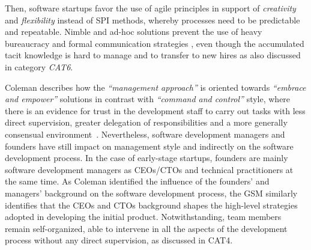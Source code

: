 \documentclass[10pt,journal,letterpaper,compsoc]{IEEEtran}
\begin{document}
Then, software startups favor the use of agile principles in support of
\textit{creativity} and \textit{flexibility} instead of SPI methods, whereby
processes need to be predictable and repeatable. Nimble and ad-hoc solutions
prevent the use of heavy bureaucracy and formal communication strategies %
, even though the accumulated tacit knowledge is hard to manage and to transfer 
to new hires as also discussed in category \textit{CAT6}.

Coleman describes how the \textit{``management approach''} is oriented towards
\textit{``embrace and empower''} solutions in contrast with \textit{``command
and control''} style, where there is an evidence for trust in the development
staff to carry out tasks with less direct supervision, greater delegation of
responsibilities and a more generally consensual environment~\cite{Coleman2008}.
Nevertheless, software development managers and founders have still impact on
management style and indirectly on the software development process. In the case
of early-stage startups, founders are mainly software development managers as
CEOs/CTOs and technical practitioners at the same time. As Coleman identified
the influence of the founders' and managers' background on the software
development process, the GSM similarly identifies that the CEOs and CTOs
background shapes the high-level strategies adopted in developing the initial
product. Notwithstanding, team members remain self-organized, able to intervene
in all the aspects of the development process without any direct supervision, as
discussed in CAT4.
\end{document}
